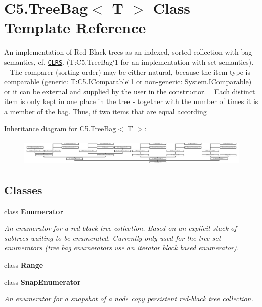 \hypertarget{class_c5_1_1_tree_bag}{}\section{C5.\+Tree\+Bag$<$ T $>$ Class Template Reference}
\label{class_c5_1_1_tree_bag}


An implementation of Red-\/\+Black trees as an indexed, sorted collection with bag semantics, cf. \href{litterature.htm#CLRS}{\tt C\+L\+R\+S}. (T\+:\+C5.\+Tree\+Bag`1 for an implementation with set semantics). ~\newline
 The comparer (sorting order) may be either natural, because the item type is comparable (generic\+: T\+:\+C5.\+I\+Comparable`1 or non-\/generic\+: System.\+I\+Comparable) or it can be external and supplied by the user in the constructor. ~\newline
 Each distinct item is only kept in one place in the tree -\/ together with the number of times it is a member of the bag. Thus, if two items that are equal according  


Inheritance diagram for C5.\+Tree\+Bag$<$ T $>$\+:\begin{figure}[H]
\begin{center}
\leavevmode
\includegraphics[height=1.314554cm]{class_c5_1_1_tree_bag}
\end{center}
\end{figure}
\subsection*{Classes}
\begin{DoxyCompactItemize}
\item 
class {\bfseries Enumerator}
\begin{DoxyCompactList}\small\item\em An enumerator for a red-\/black tree collection. Based on an explicit stack of subtrees waiting to be enumerated. Currently only used for the tree set enumerators (tree bag enumerators use an iterator block based enumerator). \end{DoxyCompactList}\item 
class {\bfseries Range}
\item 
class {\bfseries Snap\+Enumerator}
\begin{DoxyCompactList}\small\item\em An enumerator for a snapshot of a node copy persistent red-\/black tree collection. \end{DoxyCompactList}\end{DoxyCompactItemize}
